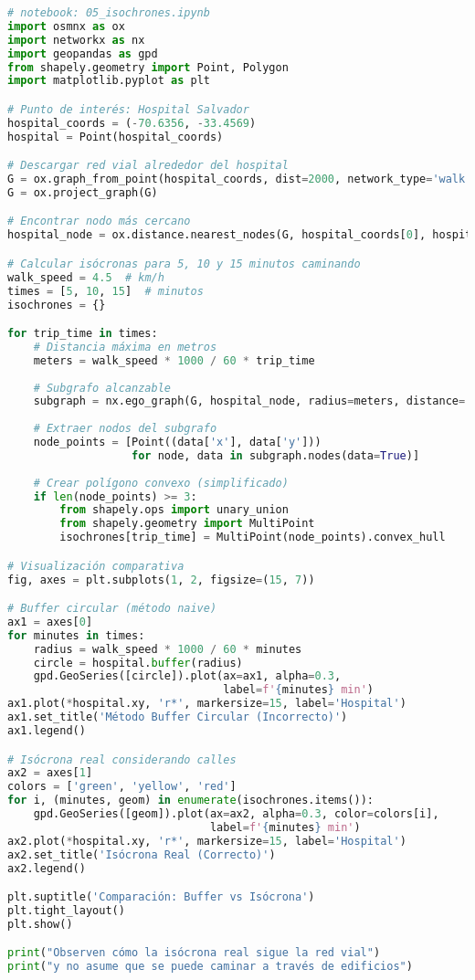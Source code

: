 \documentclass[11pt,a4paper]{article}
\begin{document}
\begin{lstlisting}[language=Python]
# notebook: 05_isochrones.ipynb
import osmnx as ox
import networkx as nx
import geopandas as gpd
from shapely.geometry import Point, Polygon
import matplotlib.pyplot as plt

# Punto de interés: Hospital Salvador
hospital_coords = (-70.6356, -33.4569)
hospital = Point(hospital_coords)

# Descargar red vial alrededor del hospital
G = ox.graph_from_point(hospital_coords, dist=2000, network_type='walk')
G = ox.project_graph(G)

# Encontrar nodo más cercano
hospital_node = ox.distance.nearest_nodes(G, hospital_coords[0], hospital_coords[1])

# Calcular isócronas para 5, 10 y 15 minutos caminando
walk_speed = 4.5  # km/h
times = [5, 10, 15]  # minutos
isochrones = {}

for trip_time in times:
    # Distancia máxima en metros
    meters = walk_speed * 1000 / 60 * trip_time
    
    # Subgrafo alcanzable
    subgraph = nx.ego_graph(G, hospital_node, radius=meters, distance='length')
    
    # Extraer nodos del subgrafo
    node_points = [Point((data['x'], data['y'])) 
                   for node, data in subgraph.nodes(data=True)]
    
    # Crear polígono convexo (simplificado)
    if len(node_points) >= 3:
        from shapely.ops import unary_union
        from shapely.geometry import MultiPoint
        isochrones[trip_time] = MultiPoint(node_points).convex_hull

# Visualización comparativa
fig, axes = plt.subplots(1, 2, figsize=(15, 7))

# Buffer circular (método naive)
ax1 = axes[0]
for minutes in times:
    radius = walk_speed * 1000 / 60 * minutes
    circle = hospital.buffer(radius)
    gpd.GeoSeries([circle]).plot(ax=ax1, alpha=0.3, 
                                 label=f'{minutes} min')
ax1.plot(*hospital.xy, 'r*', markersize=15, label='Hospital')
ax1.set_title('Método Buffer Circular (Incorrecto)')
ax1.legend()

# Isócrona real considerando calles
ax2 = axes[1]
colors = ['green', 'yellow', 'red']
for i, (minutes, geom) in enumerate(isochrones.items()):
    gpd.GeoSeries([geom]).plot(ax=ax2, alpha=0.3, color=colors[i],
                               label=f'{minutes} min')
ax2.plot(*hospital.xy, 'r*', markersize=15, label='Hospital')
ax2.set_title('Isócrona Real (Correcto)')
ax2.legend()

plt.suptitle('Comparación: Buffer vs Isócrona')
plt.tight_layout()
plt.show()

print("Observen cómo la isócrona real sigue la red vial")
print("y no asume que se puede caminar a través de edificios")
\end{lstlisting}
\end{document}
